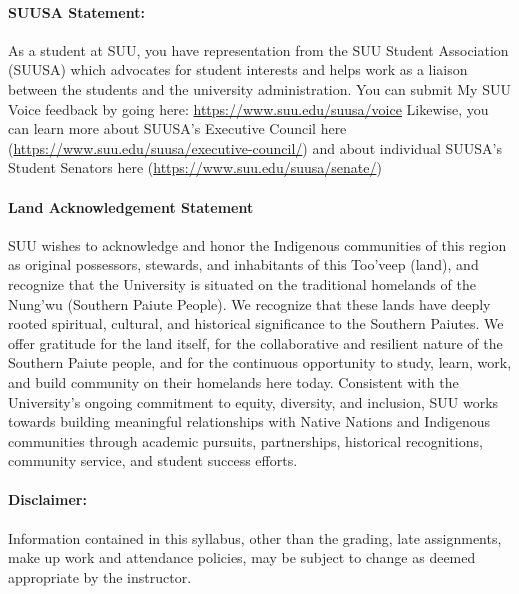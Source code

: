 \documentclass[12pt, letterpaper]{article}
\begin{document}
\paragraph{SUUSA Statement:}
As a student at SUU, you have representation from the SUU Student Association (SUUSA) which advocates for student interests and helps work as a liaison between the students and the university administration. You can submit My SUU Voice feedback by going here: \href{https://www.suu.edu/suusa/voice}{https://www.suu.edu/suusa/voice} Likewise, you can learn more about SUUSA's Executive Council here (\href{https://www.suu.edu/suusa/executive-council/}{https://www.suu.edu/suusa/executive-council/}) and about individual SUUSA's Student Senators here (\href{https://www.suu.edu/suusa/senate/}{https://www.suu.edu/suusa/senate/})

\paragraph{Land Acknowledgement Statement}
SUU wishes to acknowledge and honor the Indigenous communities of this region as original possessors, stewards, and inhabitants of this Too’veep (land), and recognize that the University is situated on the traditional homelands of the Nung’wu (Southern Paiute People). We recognize that these lands have deeply rooted spiritual, cultural, and historical significance to the Southern Paiutes. We offer gratitude for the land itself, for the collaborative and resilient nature of the Southern Paiute people, and for the continuous opportunity to study, learn, work, and build community on their homelands here today. Consistent with the University's ongoing commitment to equity, diversity, and inclusion, SUU works towards building meaningful relationships with Native Nations and Indigenous communities through academic pursuits, partnerships, historical recognitions, community service, and student success efforts.

\paragraph{Disclaimer:}
Information contained in this syllabus, other than the grading, late assignments, make up work and attendance policies, may be subject to change as deemed appropriate by the instructor.
\end{document}
